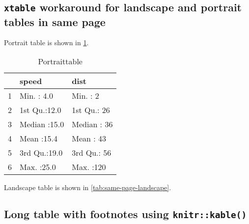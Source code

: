 \documentclass[]{article}
\begin{document}
\subsection{\texorpdfstring{\texttt{xtable} workaround for landscape and
portrait tables in same
page}{xtable workaround for landscape and portrait tables in same page}}\label{xtable-workaround-for-landscape-and-portrait-tables-in-same-page}

Portrait table is shown in \ref{tab:same-page-portrait}.

\begin{table}[ht]
\centering
\begin{tabular}{rll}
  \hline
 &     speed &      dist \\ 
  \hline
1 & Min.   : 4.0   & Min.   :  2   \\ 
  2 & 1st Qu.:12.0   & 1st Qu.: 26   \\ 
  3 & Median :15.0   & Median : 36   \\ 
  4 & Mean   :15.4   & Mean   : 43   \\ 
  5 & 3rd Qu.:19.0   & 3rd Qu.: 56   \\ 
  6 & Max.   :25.0   & Max.   :120   \\ 
   \hline
\end{tabular}
\caption{Portrait\label{tab:same-page-portrait} table} 
\end{table}

Landscape table is shown in \ref{tab:same-page-landscape}.

\begin{table}[ht]
\centering{} 
\caption{Landscape\label{tab:same-page-landscape} table}
\end{table}

\subsection{\texorpdfstring{Long table with footnotes using
\texttt{knitr::kable()}}{Long table with footnotes using knitr::kable()}}\label{long-table-with-footnotes-using-knitrkable}
\end{document}
